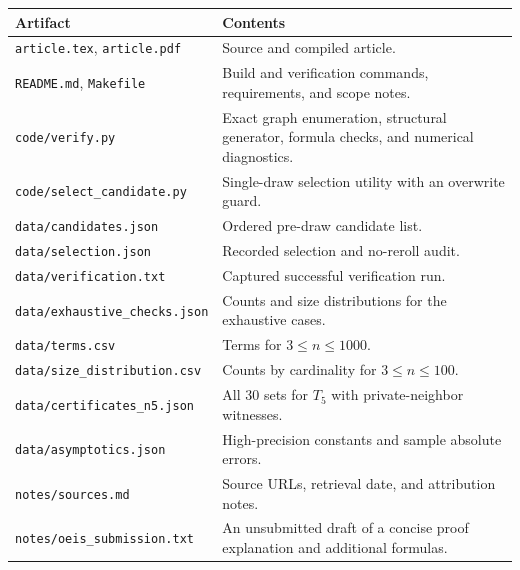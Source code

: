 \documentclass[11pt,letterpaper]{article}
\numberwithin{equation}{section}
\theoremstyle{definition}
\theoremstyle{remark}
\begin{document}
\begin{longtable}{@{}p{}p{}@{}}
\toprule
Artifact & Contents\\
\midrule
\endhead
\texttt{article.tex}, \texttt{article.pdf} & Source and compiled article.\\
\texttt{README.md}, \texttt{Makefile} & Build and verification commands,
requirements, and scope notes.\\
\texttt{code/verify.py} & Exact graph enumeration, structural generator,
formula checks, and numerical diagnostics.\\
\texttt{code/select\_candidate.py} & Single-draw selection utility with
an overwrite guard.\\
\texttt{data/candidates.json} & Ordered pre-draw candidate list.\\
\texttt{data/selection.json} & Recorded selection and no-reroll audit.\\
\texttt{data/verification.txt} & Captured successful verification run.\\
\texttt{data/exhaustive\_checks.json} & Counts and size distributions
for the exhaustive cases.\\
\texttt{data/terms.csv} & Terms for $3\le n\le1000$.\\
\texttt{data/size\_distribution.csv} & Counts by cardinality for
$3\le n\le100$.\\
\texttt{data/certificates\_n5.json} & All 30 sets for $T_5$ with
private-neighbor witnesses.\\
\texttt{data/asymptotics.json} & High-precision constants and
sample absolute errors.\\
\texttt{notes/sources.md} & Source URLs, retrieval date, and
attribution notes.\\
\texttt{notes/oeis\_submission.txt} & An unsubmitted draft of a
concise proof explanation and additional formulas.\\
\bottomrule
\end{longtable}
\end{document}
